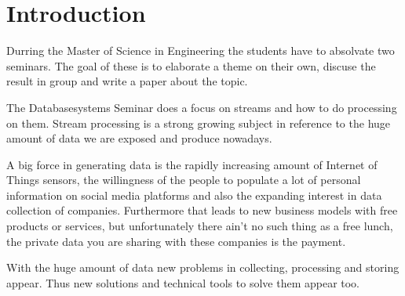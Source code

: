 \chapter{Introduction}
\label{introduction}

Durring the Master of Science in Engineering the students have to absolvate two seminars.
The goal of these is to elaborate a theme on their own, discuse the result in group and write a paper about the topic.

The Databasesystems Seminar does a focus on streams and how to do processing on them.
Stream processing is a strong growing subject in reference to the huge amount of data we are exposed and produce nowadays.

A big force in generating data is the rapidly increasing amount of Internet of Things sensors,
the willingness of the people to populate a lot of personal information on social media platforms and
also the expanding interest in data collection of companies.
Furthermore that leads to new business models with free products or services,
but unfortunately there ain't no such thing as a free lunch, the private data you are sharing with these companies is the payment.

With the huge amount of data new problems in collecting, processing and storing appear.
Thus new solutions and technical tools to solve them appear too.
